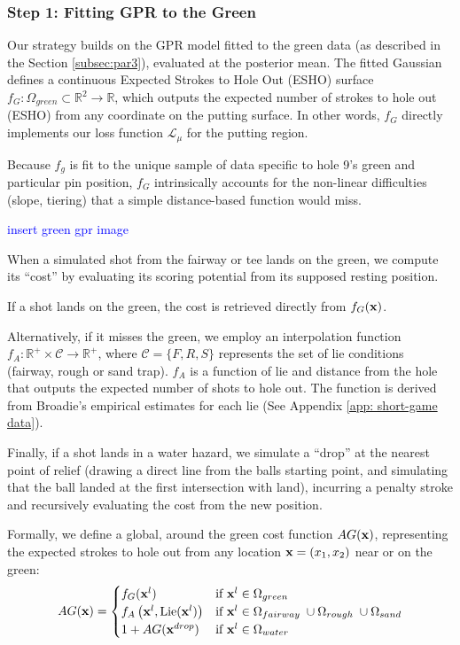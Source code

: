 \documentclass[11pt, letterpaper]{article}
\begin{document}
\subsubsection{Step 1: Fitting GPR to the Green}
Our strategy builds on the GPR model fitted to the green data (as described in the Section \ref{subsec:par3}), evaluated at the posterior mean. The fitted Gaussian defines a continuous Expected Strokes to Hole Out (ESHO) surface $f_G: \Omega_{green} \subset \mathbb{R}^2 \to \mathbb{R}$, which outputs the expected number of strokes to hole out (ESHO) from any coordinate on the putting surface. In other words, $f_G$ directly implements our loss function $\mathcal{L}_\mu$ for the putting region.


Because $f_g$ is fit to the unique sample of data specific to hole 9's green and particular pin position, $f_G$ intrinsically accounts for the non-linear difficulties (slope, tiering) that a simple distance-based function would miss.

\textcolor{blue}{insert green gpr image}

When a simulated shot from the fairway or tee lands on the green, we compute its ``cost'' by evaluating its scoring potential from its supposed resting position.

If a shot lands on the green, the cost is retrieved directly from $f_G(\mathbf{x})$. 

Alternatively, if it misses the green, we employ an interpolation function $f_A: \mathbb{R}^+ \times \mathcal{C} \to \mathbb{R}^+$, where $\mathcal{C} = \{F, R, S\}$ represents the set of lie conditions (fairway, rough or sand trap). $f_A$ is a function of lie and distance from the hole that outputs the expected number of shots to hole out. The function is derived from Broadie's empirical estimates for each lie (See Appendix \ref{app: short-game data}).

Finally, if a shot lands in a water hazard, we simulate a ``drop'' at the nearest point of relief (drawing a direct line from the balls starting point, and simulating that the ball landed at the first intersection with land), incurring a penalty stroke and recursively evaluating the cost from the new position.

Formally, we define a global, around the green cost function $AG(\mathbf{x})$, representing the expected strokes to hole out from any location $\mathbf{x} = (x_1, x_2)$ near or on the green:
\[
AG(\mathbf{x}) = \begin{cases}
    f_G(\mathbf{x}^l)& \text{if } \mathbf{x}^l \in \Omega_{green} \\
    f_A\left(\mathbf{x}^l, \text{Lie}(\mathbf{x}^l)\right) & \text{if } \mathbf{x}^l \in \Omega_{fairway}\; \cup \Omega_{rough} \; \cup \Omega_{sand}  \\
    1 + AG(\mathbf{x}^{drop}) & \text{if } \mathbf{x}^l \in \Omega_{water}
\end{cases}
\]
\end{document}
